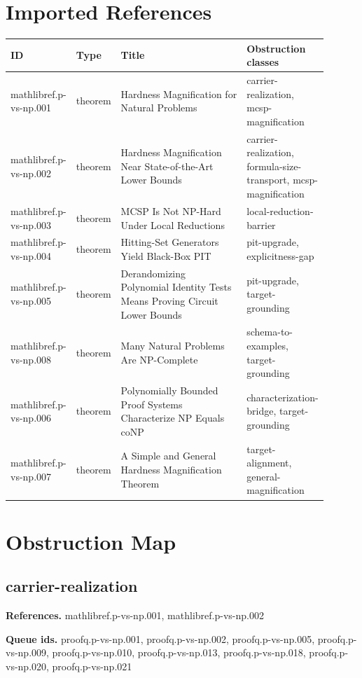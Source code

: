 \documentclass[11pt]{article}
\begin{document}
\section{Imported References}
\begin{longtable}{p{0.13\linewidth}p{0.1\linewidth}p{0.42\linewidth}p{0.25\linewidth}}
\toprule
ID & Type & Title & Obstruction classes \\
\midrule
mathlibref.p-vs-np.001 & theorem & Hardness Magnification for Natural Problems & carrier-realization, mcsp-magnification \\
mathlibref.p-vs-np.002 & theorem & Hardness Magnification Near State-of-the-Art Lower Bounds & carrier-realization, formula-size-transport, mcsp-magnification \\
mathlibref.p-vs-np.003 & theorem & MCSP Is Not NP-Hard Under Local Reductions & local-reduction-barrier \\
mathlibref.p-vs-np.004 & theorem & Hitting-Set Generators Yield Black-Box PIT & pit-upgrade, explicitness-gap \\
mathlibref.p-vs-np.005 & theorem & Derandomizing Polynomial Identity Tests Means Proving Circuit Lower Bounds & pit-upgrade, target-grounding \\
mathlibref.p-vs-np.008 & theorem & Many Natural Problems Are NP-Complete & schema-to-examples, target-grounding \\
mathlibref.p-vs-np.006 & theorem & Polynomially Bounded Proof Systems Characterize NP Equals coNP & characterization-bridge, target-grounding \\
mathlibref.p-vs-np.007 & theorem & A Simple and General Hardness Magnification Theorem & target-alignment, general-magnification \\
\bottomrule
\end{longtable}

\section{Obstruction Map}
\subsection*{carrier-realization}
\textbf{References.} mathlibref.p-vs-np.001, mathlibref.p-vs-np.002

\textbf{Queue ids.} proofq.p-vs-np.001, proofq.p-vs-np.002, proofq.p-vs-np.005, proofq.p-vs-np.009, proofq.p-vs-np.010, proofq.p-vs-np.013, proofq.p-vs-np.018, proofq.p-vs-np.020, proofq.p-vs-np.021
\end{document}
